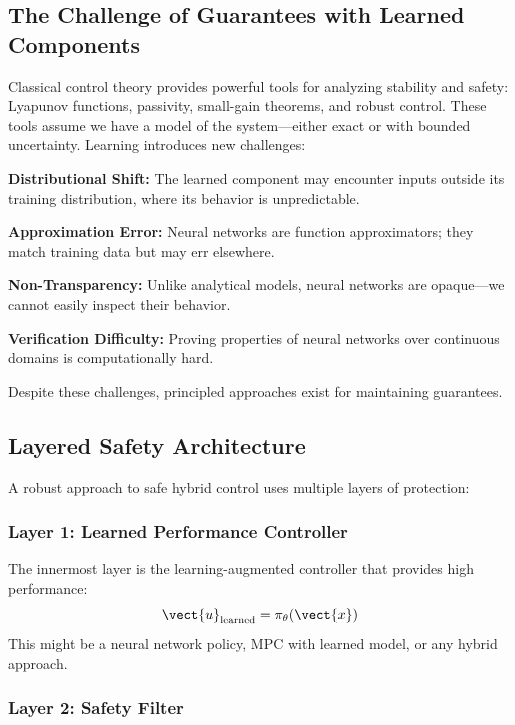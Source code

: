 \subsection{The Challenge of Guarantees with Learned Components}

Classical control theory provides powerful tools for analyzing stability and safety: Lyapunov functions, passivity, small-gain theorems, and robust control. These tools assume we have a model of the system---either exact or with bounded uncertainty. Learning introduces new challenges:

\textbf{Distributional Shift:} The learned component may encounter inputs outside its training distribution, where its behavior is unpredictable.

\textbf{Approximation Error:} Neural networks are function approximators; they match training data but may err elsewhere.

\textbf{Non-Transparency:} Unlike analytical models, neural networks are opaque---we cannot easily inspect their behavior.

\textbf{Verification Difficulty:} Proving properties of neural networks over continuous domains is computationally hard.

Despite these challenges, principled approaches exist for maintaining guarantees.

\subsection{Layered Safety Architecture}

A robust approach to safe hybrid control uses multiple layers of protection:

\subsubsection{Layer 1: Learned Performance Controller}

The innermost layer is the learning-augmented controller that provides high performance:
\begin{equation}
\vect{u}_{\text{learned}} = \pi_\theta(\vect{x})
\end{equation}
This might be a neural network policy, MPC with learned model, or any hybrid approach.

\subsubsection{Layer 2: Safety Filter}

